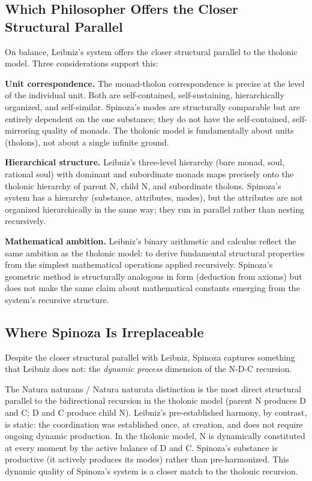 \documentclass[12pt]{article}
\begin{document}
\subsection{Which Philosopher Offers the Closer Structural Parallel}\label{which-philosopher-offers-the-closer-structural-parallel}

On balance, Leibniz's system offers the closer structural parallel to
the tholonic model. Three considerations support this:

\textbf{Unit correspondence.} The monad-tholon correspondence is precise
at the level of the individual unit. Both are self-contained,
self-sustaining, hierarchically organized, and self-similar. Spinoza's
modes are structurally comparable but are entirely dependent on the one
substance; they do not have the self-contained, self-mirroring quality
of monads. The tholonic model is fundamentally about units (tholons),
not about a single infinite ground.

\textbf{Hierarchical structure.} Leibniz's three-level hierarchy (bare
monad, soul, rational soul) with dominant and subordinate monads maps
precisely onto the tholonic hierarchy of parent N, child N, and
subordinate tholons. Spinoza's system has a hierarchy (substance,
attributes, modes), but the attributes are not organized hierarchically
in the same way; they run in parallel rather than nesting recursively.

\textbf{Mathematical ambition.} Leibniz's binary arithmetic and calculus
reflect the same ambition as the tholonic model: to derive fundamental
structural properties from the simplest mathematical operations applied
recursively. Spinoza's geometric method is structurally analogous in
form (deduction from axioms) but does not make the same claim about
mathematical constants emerging from the system's recursive structure.

\subsection{Where Spinoza Is Irreplaceable}\label{where-spinoza-is-irreplaceable}

Despite the closer structural parallel with Leibniz, Spinoza captures
something that Leibniz does not: the \emph{dynamic process} dimension of
the N-D-C recursion.

The Natura naturans / Natura naturata distinction is the most direct
structural parallel to the bidirectional recursion in the tholonic model
(parent N produces D and C; D and C produce child N). Leibniz's
pre-established harmony, by contrast, is static: the coordination was
established once, at creation, and does not require ongoing dynamic
production. In the tholonic model, N is dynamically constituted at every
moment by the active balance of D and C. Spinoza's substance is
productive (it actively produces its modes) rather than pre-harmonized.
This dynamic quality of Spinoza's system is a closer match to the
tholonic recursion.
\end{document}
